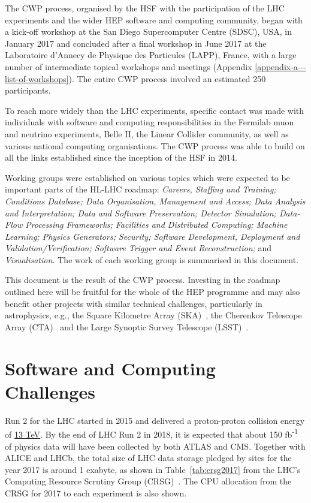 The CWP process, organised by the HSF with the participation of the LHC
experiments and the wider HEP software and computing community, began
with a kick-off workshop at the San Diego Supercomputer Centre (SDSC),
USA, in January 2017 and concluded after a final workshop in June 2017 at
the Laboratoire d'Annecy de Physique des Particules (LAPP), France, with
a large number of intermediate topical workshops and meetings
(Appendix \ref{appendix-a---list-of-workshops}). The
entire CWP process involved an estimated 250 participants.

To reach more widely than the LHC experiments, specific contact was made
with individuals with software and computing responsibilities in the
Fermilab muon and neutrino experiments, Belle II, the Linear Collider
community, as well as various national computing organisations. The CWP
process was able to build on all the links established since the
inception of the HSF in 2014.

Working groups were established on various topics which were expected to
be important parts of the HL-LHC roadmap: \emph{Careers, Staffing and
Training; Conditions Database; Data Organisation, Management and Access;
Data Analysis and Interpretation; Data and Software Preservation;
Detector Simulation; Data-Flow Processing Frameworks; Facilities and
Distributed Computing; Machine Learning; Physics Generators; Security;
Software Development, Deployment and Validation/Verification; Software
Trigger and Event Reconstruction;} and \emph{Visualisation.} The work of
each working group is summarised in this document.

This document is the result of the CWP process. Investing in the roadmap
outlined here will be fruitful for the whole of the HEP programme and
may also benefit other projects with similar technical challenges,
particularly in astrophysics, e.g., the Square Kilometre Array (SKA)~\cite{SKA},
the Cherenkov Telescope Array (CTA)~\cite{CTA} and the Large Synoptic Survey
Telescope (LSST)~\cite{LSST}.

\hypertarget{software-and-computing-challenges}{%
\section{Software and Computing
Challenges}\label{software-and-computing-challenges}}

Run 2 for the LHC started in 2015 and delivered a proton-proton
collision energy of
\href{http://home.cern/about/engineering/restarting-lhc-why-13-tev}{13
TeV}. By the end of LHC Run 2 in 2018, it is expected that about 150
fb\textsuperscript{-1} of physics data will have been collected by both
ATLAS and CMS. Together with ALICE and LHCb, the total size of LHC data
storage pledged by sites for the year 2017 is around 1 exabyte, as shown
in Table~\ref{tab:crsg2017} from the LHC's Computing Resource Scrutiny Group
(CRSG)~\cite{Lucchesi:2284575}. The CPU allocation from the CRSG for 2017 to each
experiment is also shown.

